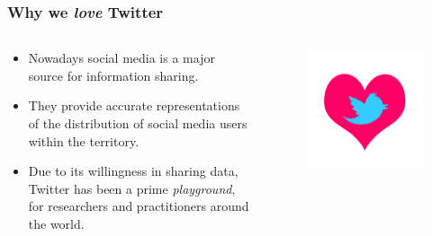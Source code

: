 \documentclass[hyperref={pdfpagelabels=true}]{beamer}
\begin{document}
\begin{frame}
\frametitle{Why we \textit{love} Twitter}
\begin{columns}
  \begin{column}{0.7\textwidth}\small{ 

  \begin{itemize}    
    \item<1->Nowadays social media is a major source for information sharing. %
    \item<2->They provide accurate representations of the distribution of social media users within the territory.%
    \item<3->Due to its willingness in sharing data, Twitter has been a prime \textit{playground}, for researchers and practitioners around the world.  
  \end{itemize} }
  \end{column}
  \begin{column}{0.3\textwidth}        
    \begin{figure}   
      \includegraphics[width=\textwidth]{love.jpg}   
    \end{figure}     
  \end{column}  
\end{columns}    
\end{frame}
\end{document}
